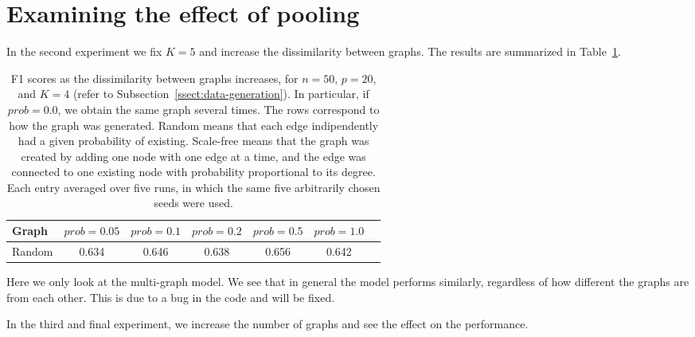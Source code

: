 \documentclass[a4paper, 11pt, oneside]{report}
\newcommand{\1}{\mathds{1}}
\begin{document}
\section{Examining the effect of pooling}\label{sect:perf-self}
In the second experiment we fix $K=5$ and increase the dissimilarity between graphs.
The results are summarized in Table~\ref{tab:mg-more-random}.
\begin{table}[ht]
	\caption{F1 scores as the dissimilarity between graphs increases, for $n=50$, $p=20$, and $K=4$ (refer to Subsection~\ref{ssect:data-generation}).
		In particular, if $prob = 0.0$, we obtain the same graph several times.
		The rows correspond to how the graph was generated.
		Random means that each edge indipendently had a given probability of existing.
		Scale-free means that the graph was created by adding one node with one edge at a time, and the edge was connected to one existing node with probability proportional to its degree.
		Each entry averaged over five runs, in which the same five arbitrarily chosen seeds were used.
	}
	\label{tab:mg-more-random}
	\begin{center}
		\begin{tabular}[c]{l|cccccc}
			\toprule
			Graph  & $prob = 0.05$ & $prob = 0.1$ & $prob = 0.2$ & $prob = 0.5$ & $prob = 1.0$ \\
			\midrule
			Random & 0.634         & 0.646        & 0.638        & 0.656        & 0.642        \\
			\bottomrule
		\end{tabular}
	\end{center}
\end{table}
Here we only look at the multi-graph model.
We see that in general the model performs similarly,
regardless of how different the graphs are from each other.
This is due to a bug in the code and will be fixed.


In the third and final experiment, we increase the number of graphs and see the effect on the performance.
\end{document}
